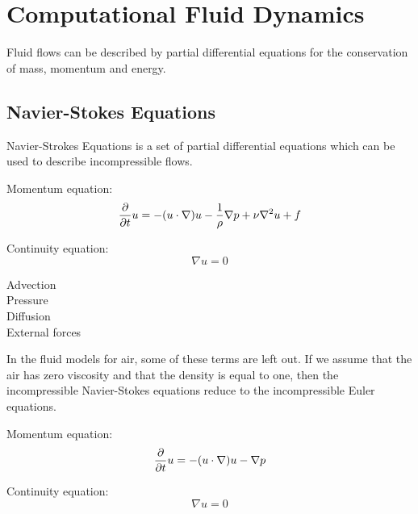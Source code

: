 \section{Computational Fluid Dynamics}

Fluid flows can be described by partial differential equations for the conservation 
of mass, momentum and energy. 

\subsection{Navier-Stokes Equations}

Navier-Strokes Equations is a set of partial differential equations which can be
used to describe incompressible flows\cite{fluidDynamicsIntro}. 

Momentum equation: 
$$\frac{\partial}{\partial t}u  = -(u \cdot \nabla)u - \frac{1}{\rho}\nabla p + \nu \nabla^2 u + f$$

Continuity equation:
$$\nabla u = 0$$

\begin{description}
	\item[Advection]
	\item[Pressure]
	\item[Diffusion]
	\item[External forces]
\end{description}

In the fluid models for air, some of these terms are left out. If we assume that 
the air has zero viscosity and that the density is equal to one, then the 
incompressible Navier-Stokes equations reduce to the incompressible Euler 
equations. 

Momentum equation: 
$$\frac{\partial}{\partial t}u  = -(u \cdot \nabla)u - \nabla p$$

Continuity equation:
$$\nabla u = 0$$
